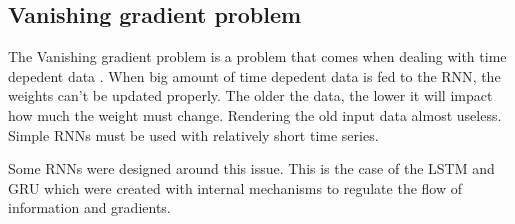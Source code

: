 \subsection{Vanishing gradient problem}

The Vanishing gradient problem is a problem that comes when dealing with time depedent data \cite{vanishGrad}. When big amount of time depedent data is fed to the \ac{RNN}, the weights can't be updated properly. The older the data, the lower it will impact how much the weight must change. Rendering the old input data almost useless. Simple \acp{RNN} must be used with relatively short time series.

Some \acp{RNN} were designed around this issue. This is the case of the \ac{LSTM} and \ac{GRU} which were created with internal mechanisms to regulate the flow of information and gradients.

